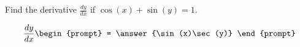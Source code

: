 \documentclass{ximera}
\author{Gregory Hartman \and Matthew Carr}
\begin{document}
\begin{exercise}



Find the derivative $\frac{dy}{dx}$ if $\cos(x)+\sin(y)=1$.

\[
\frac{dy}{dx}
\begin{prompt}
= \answer{\sin(x)\sec(y)}
\end{prompt}
\]

\end{exercise}
\end{document}
